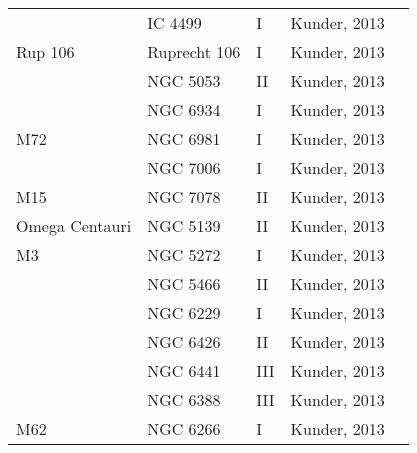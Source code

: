 \documentclass[]{article}
\begin{document}
\begin{longtable}{
	p{1.5cm}|
	p{2.5cm}|
	p{2.5cm}|
	p{3.7cm}|
	p{5.5cm}
	@{}}
		& IC 4499      & I          & Kunder, 2013         &                                                                        \\
		Rup 106        & Ruprecht 106 & I          & Kunder, 2013         &                                                                        \\
		& NGC 5053     & II         & Kunder, 2013         &                                                                        \\
		& NGC 6934     & I          & Kunder, 2013         &                                                                        \\
		M72            & NGC 6981     & I          & Kunder, 2013         &                                                                        \\
		& NGC 7006     & I          & Kunder, 2013         &                                                                        \\
		M15            & NGC 7078     & II         & Kunder, 2013         &                                                                        \\
		Omega Centauri & NGC 5139     & II         & Kunder, 2013         &                                                                        \\
		M3             & NGC 5272     & I          & Kunder, 2013         &                                                                        \\
		& NGC 5466     & II         & Kunder, 2013         &                                                                        \\
		& NGC 6229     & I          & Kunder, 2013         &                                                                        \\
		& NGC 6426     & II         & Kunder, 2013         &                                                                        \\
		& NGC 6441     & III        & Kunder, 2013         &                                                                        \\
		& NGC 6388     & III        & Kunder, 2013         &                                                                        \\
		M62            & NGC 6266     & I          & Kunder, 2013         &                                                                        \\

\end{longtable}
\end{document}
